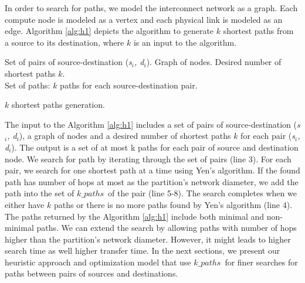 In order to search for paths, we model the interconnect network as a graph. Each compute node is modeled as a vertex and each physical link is modeled as an edge. Algorithm \ref{alg:h1} depicts the algorithm to generate $k$ shortest paths from a source to its destination, where $k$ is an input to the algorithm.
\begin{algorithm}[!htbp]
 Set of pairs of source-destination (\textit{s$_i$, d$_i$}). Graph of nodes. Desired number of shortest paths $k$.\\
 Set of paths: $k$ paths for each source-destination pair.\\
\caption{$k$ shortest paths generation.}
\label{alg:h1}
\end{algorithm}

The input to the Algorithm \ref{alg:h1} includes a set of pairs of source-destination (\textit{s$_i$, d$_i$}), a graph of nodes and a desired number of shortest paths $k$ for each pair (\textit{s$_i$, d$_i$}). The output is a set of at most k paths for each pair of source and destination node. We search for path by iterating through the set of pairs (line 3). For each pair, we search for one shortest path at a time using Yen's algorithm. If the found path has number of hops at most as the partition's network diameter, we add the path into the set of $k\_paths$\ of the pair (line 5-8). The search completes when we either have $k$ paths or there is no more paths found by Yen's algorithm (line 4). The paths returned by the Algorithm \ref{alg:h1} include both minimal and non-minimal paths. We can extend the search by allowing paths with number of hops higher than the partition's network diameter. However, it might leads to higher search time as well higher transfer time. In the next sections, we present our heuristic approach and optimization model that use $k\_paths$\ for finer searches for paths between pairs of sources and destinations.
